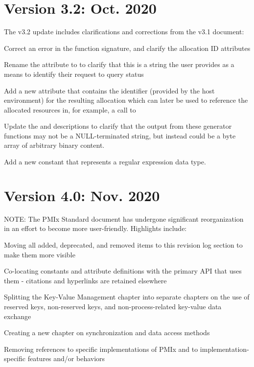 \section{Version 3.2: Oct. 2020}

The v3.2 update includes clarifications and corrections from the v3.1 document:

\begin{compactitemize}
    \item Correct an error in the  function signature, and clarify the allocation ID attributes
    \item Rename the  attribute to  to clarify that this is a string the user provides as a means to identify their request to query status
    \item Add a new  attribute that contains the identifier (provided by the host environment) for the resulting allocation which can later be used to reference the allocated resources in, for example, a call to 
    \item Update the  and  descriptions to clarify that the output from these generator functions may not be a NULL-terminated string, but instead could be a byte array of arbitrary binary content.
    \item Add a new  constant that represents a regular expression data type.
\end{compactitemize}

\section{Version 4.0: Nov. 2020}

NOTE: The PMIx Standard document has undergone significant reorganization in an
effort to become more user-friendly. Highlights include:

\begin{compactitemize}
    \item Moving all added, deprecated, and removed items to this revision log
    section to make them more visible
    \item Co-locating constants and attribute definitions with the primary
    API that uses them - citations and hyperlinks are retained elsewhere
    \item Splitting the Key-Value Management chapter into separate chapters on
    the use of reserved keys, non-reserved keys, and non-process-related
    key-value data exchange
    \item Creating a new chapter on synchronization and data access methods
    \item Removing references to specific implementations of \ac{PMIx} and to implementation-specific features
    and/or behaviors
\end{compactitemize}

